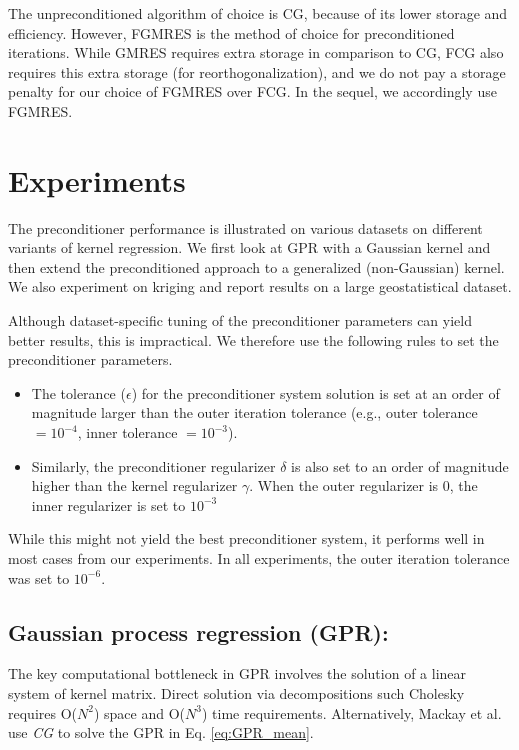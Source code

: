 \documentclass[10pt,journal,letterpaper,compsoc]{IEEEtran}
\begin{document}
The unpreconditioned algorithm of choice is CG, because of its lower storage and efficiency. However, FGMRES is the method of choice for preconditioned iterations. While GMRES requires extra storage in comparison to CG, FCG also requires this extra storage (for reorthogonalization), and we do not pay a storage penalty for our choice of FGMRES over FCG. In the sequel, we accordingly use FGMRES.

\section{Experiments\label{sec:Experiments}}
The preconditioner performance is illustrated on various datasets on different variants of kernel regression. We first look at GPR with a Gaussian kernel and then extend the preconditioned approach to a generalized (non-Gaussian) kernel. We also experiment on kriging \cite{AppliedGeostatistics} and report results on a large geostatistical dataset.

Although dataset-specific tuning of the preconditioner parameters can yield better results, this is impractical. We therefore use the following rules to set the preconditioner parameters.
\begin{itemize}
    \item The tolerance ($\epsilon$) for the preconditioner system solution is set at an order of magnitude larger than the outer iteration tolerance (e.g., outer tolerance $= 10^{-4}$, inner tolerance $=10^{-3}$).
    \item Similarly, the preconditioner regularizer $\delta$ is also set to an order of magnitude higher than the kernel regularizer $\gamma$. When the outer regularizer is $0$, the inner regularizer is set to $10^{-3}$
\end{itemize}
While this might not yield the best preconditioner system, it performs well in most cases from our experiments. In all experiments, the outer iteration tolerance was set to $10^{-6}$.

\subsection{Gaussian process regression (GPR): } The key computational bottleneck in GPR involves the solution of a linear system of kernel matrix. Direct solution via decompositions such Cholesky \cite{GPML_Rasmussen} requires O($N^2$) space and O($N^3$) time requirements. Alternatively, Mackay et al. \cite{GPML_Mackay} use \emph{CG} to solve the GPR in Eq. \ref{eq:GPR_mean}.
\end{document}

